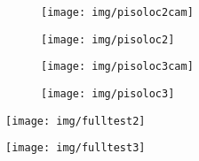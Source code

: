 \documentclass[notes,slidesec,a4]{seminar}
\begin{document}
\begin{hslide}

\begin{center}
	\begin{figure}
		\centering
		\begin{subfigure}
			\centering
			\texttt{[image: img/pisoloc2cam]}
		\end{subfigure}%
		\begin{subfigure}
			\centering
			\texttt{[image: img/pisoloc2]}
		\end{subfigure}
	\end{figure}
\end{center}	

\end{hslide}


\begin{hslide}

\begin{center}
	\begin{figure}
		\centering
		\begin{subfigure}
			\centering
			\texttt{[image: img/pisoloc3cam]}
		\end{subfigure}%
		\begin{subfigure}
			\centering
			\texttt{[image: img/pisoloc3]}
		\end{subfigure}
	\end{figure}
\end{center}

\end{hslide}


\begin{hslide}

\begin{center}
	\begin{figure}
		\centering
		\texttt{[image: img/fulltest2]}
	\end{figure}
\end{center}

\end{hslide}


\begin{hslide}

\begin{center}
	\begin{figure}
		\centering
		\texttt{[image: img/fulltest3]}
	\end{figure}
\end{center}

\end{hslide}
\end{document}

